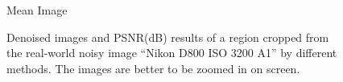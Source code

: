 \begin{figure}[t!]
{\begin{minipage}[t]{0.19\textwidth}
{\footnotesize Mean Image}
\end{minipage}
} \vspace{-3mm}
    \caption{Denoised images and PSNR(dB) results of a region cropped from the real-world noisy image ``Nikon D800 ISO 3200 A1'' \cite{crosschannel2016} by different methods. The images are better to be zoomed in on screen.}
    \label{fig3-17}
\vspace{-4mm}
\end{figure}

\begin{figure}[t!]
    \centering
{}
\end{figure}
